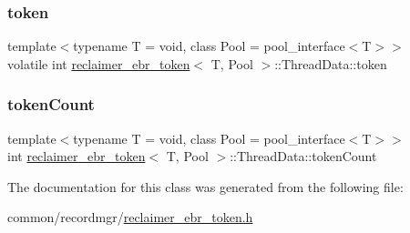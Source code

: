 \mbox{\label{classreclaimer__ebr__token_1_1ThreadData_a4b6b47b02cb3e120d4fb9fa8820e5b4d}} 
\subsubsection{\texorpdfstring{token}{token}}
{\footnotesize\ttfamily template$<$typename T  = void, class Pool  = pool\+\_\+interface$<$\+T$>$$>$ \\
volatile int \hyperlink{classreclaimer__ebr__token}{reclaimer\+\_\+ebr\+\_\+token}$<$ T, Pool $>$\+::Thread\+Data\+::token}

\mbox{\label{classreclaimer__ebr__token_1_1ThreadData_aef3ca8bfcf65b876744855d00f19d482}} 
\subsubsection{\texorpdfstring{token\+Count}{tokenCount}}
{\footnotesize\ttfamily template$<$typename T  = void, class Pool  = pool\+\_\+interface$<$\+T$>$$>$ \\
int \hyperlink{classreclaimer__ebr__token}{reclaimer\+\_\+ebr\+\_\+token}$<$ T, Pool $>$\+::Thread\+Data\+::token\+Count}



The documentation for this class was generated from the following file\+:\begin{DoxyCompactItemize}
\item 
common/recordmgr/\hyperlink{reclaimer__ebr__token_8h}{reclaimer\+\_\+ebr\+\_\+token.\+h}\end{DoxyCompactItemize}
